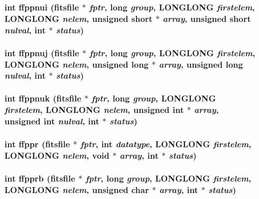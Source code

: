 \subsubsection{\setlength{\rightskip}{0pt plus 5cm}int ffppnui (\bf{fitsfile} $\ast$ {\em fptr}, long {\em group}, \bf{LONGLONG} {\em firstelem}, \bf{LONGLONG} {\em nelem}, unsigned short $\ast$ {\em array}, unsigned short {\em nulval}, int $\ast$ {\em status})}\label{fitsio_8h_525842763bdaa4507a3a935d347a0462}


\subsubsection{\setlength{\rightskip}{0pt plus 5cm}int ffppnuj (\bf{fitsfile} $\ast$ {\em fptr}, long {\em group}, \bf{LONGLONG} {\em firstelem}, \bf{LONGLONG} {\em nelem}, unsigned long $\ast$ {\em array}, unsigned long {\em nulval}, int $\ast$ {\em status})}\label{fitsio_8h_fc1d4fc6ae72ad09956653077c3813af}


\subsubsection{\setlength{\rightskip}{0pt plus 5cm}int ffppnuk (\bf{fitsfile} $\ast$ {\em fptr}, long {\em group}, \bf{LONGLONG} {\em firstelem}, \bf{LONGLONG} {\em nelem}, unsigned int $\ast$ {\em array}, unsigned int {\em nulval}, int $\ast$ {\em status})}\label{fitsio_8h_95d87d24a1245de2f3cb4178a78cac04}


\subsubsection{\setlength{\rightskip}{0pt plus 5cm}int ffppr (\bf{fitsfile} $\ast$ {\em fptr}, int {\em datatype}, \bf{LONGLONG} {\em firstelem}, \bf{LONGLONG} {\em nelem}, void $\ast$ {\em array}, int $\ast$ {\em status})}\label{fitsio_8h_f931a67d7160cdaf855057098337511f}


\subsubsection{\setlength{\rightskip}{0pt plus 5cm}int ffpprb (\bf{fitsfile} $\ast$ {\em fptr}, long {\em group}, \bf{LONGLONG} {\em firstelem}, \bf{LONGLONG} {\em nelem}, unsigned char $\ast$ {\em array}, int $\ast$ {\em status})}\label{fitsio_8h_edd9b7d590d4caaf22a5a02f2123e981}


